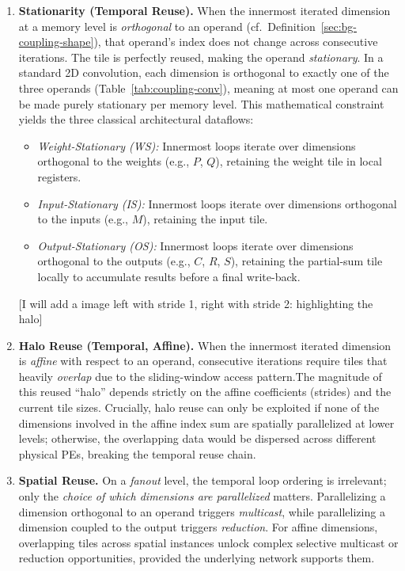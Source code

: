 \begin{enumerate}
  \item \textbf{Stationarity (Temporal Reuse).}
    When the innermost iterated dimension at a memory level is \emph{orthogonal} to an operand (cf.~Definition~\ref{sec:bg-coupling-shape}), that operand's index does not change across consecutive iterations. The tile is perfectly reused, making the operand \emph{stationary}. In a standard 2D convolution, each dimension is orthogonal to exactly one of the three operands (Table~\ref{tab:coupling-conv}), meaning at most one operand can be made purely stationary per memory level. This mathematical constraint yields the three classical architectural dataflows:
    \begin{itemize}
      \item \emph{Weight-Stationary (WS):} Innermost loops iterate over dimensions orthogonal to the weights (e.g., $P$, $Q$), retaining the weight tile in local registers.
      \item \emph{Input-Stationary (IS):} Innermost loops iterate over dimensions orthogonal to the inputs (e.g., $M$), retaining the input tile.
      \item \emph{Output-Stationary (OS):} Innermost loops iterate over dimensions orthogonal to the outputs (e.g., $C$, $R$, $S$), retaining the partial-sum tile locally to accumulate results before a final write-back.
    \end{itemize}

[I will add a image left with stride 1, right with stride 2: highlighting the halo]
  \item \textbf{Halo Reuse (Temporal, Affine).}
    When the innermost iterated dimension is \emph{affine} with respect to an operand, consecutive iterations require tiles that heavily \emph{overlap} due to the sliding-window access pattern.The magnitude of this reused ``halo'' depends strictly on the affine coefficients (strides) and the current tile sizes. Crucially, halo reuse can only be exploited if none of the dimensions involved in the affine index sum are spatially parallelized at lower levels; otherwise, the overlapping data would be dispersed across different physical PEs, breaking the temporal reuse chain.

  \item \textbf{Spatial Reuse.}
    On a \emph{fanout} level, the temporal loop ordering is irrelevant; only the \emph{choice of which dimensions are parallelized} matters. Parallelizing a dimension orthogonal to an operand triggers \emph{multicast}, while parallelizing a dimension coupled to the output triggers \emph{reduction}. For affine dimensions, overlapping tiles across spatial instances unlock complex selective multicast or reduction opportunities, provided the underlying network supports them.
\end{enumerate}

